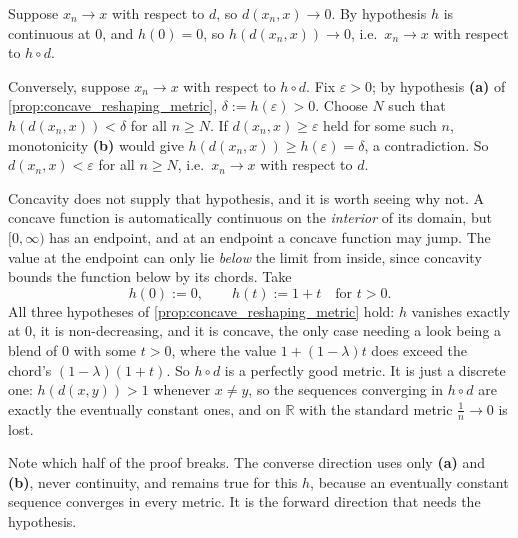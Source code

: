 \begin{exercisesolution}
\label{sol:reshaping_same_convergence}
Suppose $x_n \to x$ with respect to $d$, so $d(x_n,x) \to 0$. By hypothesis $h$ is continuous at
$0$, and $h(0)=0$, so $h(d(x_n,x)) \to 0$, i.e.\ $x_n \to x$ with respect to $h \circ d$.

Conversely, suppose $x_n \to x$ with respect to $h \circ d$. Fix $\varepsilon > 0$; by hypothesis
\textbf{(a)} of \cref{prop:concave_reshaping_metric}, $\delta := h(\varepsilon) > 0$. Choose $N$
such that $h(d(x_n,x)) < \delta$ for all $n \geq N$. If $d(x_n,x) \geq \varepsilon$ held for some
such $n$, monotonicity \textbf{(b)} would give $h(d(x_n,x)) \geq h(\varepsilon) = \delta$, a
contradiction. So $d(x_n,x) < \varepsilon$ for all $n \geq N$, i.e.\ $x_n \to x$ with respect to
$d$.

\begin{remark}
Concavity does not supply that hypothesis, and it is worth seeing why not. A concave function is
automatically continuous on the \emph{interior} of its domain, but $[0,\infty)$ has an endpoint,
and at an endpoint a concave function may jump. The value at the endpoint can only lie
\emph{below} the limit from inside, since concavity bounds the function below by its chords. Take
\[h(0) := 0, \qquad h(t) := 1+t \quad \text{for } t>0.\]
All three hypotheses of \cref{prop:concave_reshaping_metric} hold: $h$ vanishes exactly at $0$,
it is non-decreasing, and it is concave, the only case needing a look being a blend of $0$ with
some $t>0$, where the value $1+(1-\lambda)t$ does exceed the chord's $(1-\lambda)(1+t)$. So
$h \circ d$ is a perfectly good metric. It is just a discrete one: $h(d(x,y)) > 1$ whenever
$x \neq y$, so the sequences converging in $h \circ d$ are exactly the eventually constant ones,
and on $\mathbb{R}$ with the standard metric $\tfrac1n \to 0$ is lost.

Note which half of the proof breaks. The converse direction uses only \textbf{(a)} and
\textbf{(b)}, never continuity, and remains true for this $h$, because an eventually constant
sequence converges in every metric. It is the forward direction that needs the hypothesis.
\end{remark}
\end{exercisesolution}

